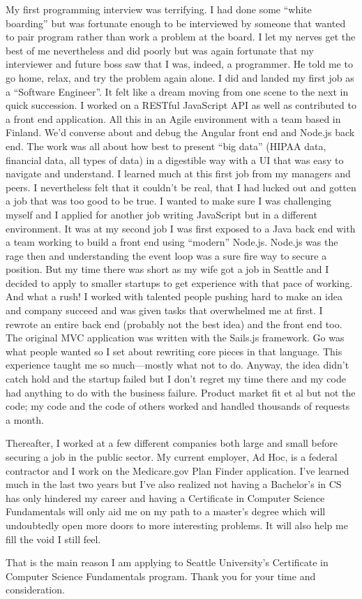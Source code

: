 \documentclass[12pt]{article}
\begin{document}
My first programming interview was terrifying. I had done some ``white boarding'' but was fortunate enough to be interviewed by someone that wanted to pair program rather than work a problem at the board. I let my nerves get the best of me nevertheless and did poorly but was again fortunate that my interviewer and future boss saw that I was, indeed, a programmer. He told me to go home, relax, and try the problem again alone. I did and landed my first job as a ``Software Engineer''. It felt like a dream moving from one scene to the next in quick succession. I worked on a RESTful JavaScript API as well as contributed to a front end application. All this in an Agile environment with a team based in Finland. We'd converse about and debug the Angular front end and Node.js back end. The work was all about how best to present ``big data'' (HIPAA data, financial data, all types of data) in a digestible way with a UI that was easy to navigate and understand. I learned much at this first job from my managers and peers. I nevertheless felt that it couldn't be real, that I had lucked out and gotten a job that was too good to be true. I wanted to make sure I was challenging myself and I applied for another job writing JavaScript but in a different environment.
It was at my second job I was first exposed to a Java back end with a team working to build a front end using ``modern'' Node.js. Node.js was the rage then and understanding the event loop was a sure fire way to secure a position. But my time there was short as my wife got a job in Seattle and I decided to apply to smaller startups to get experience with that pace of working. And what a rush! I worked with talented people pushing hard to make an idea and company succeed and was given tasks that overwhelmed me at first. I rewrote an entire back end (probably not the best idea) and the front end too. The original MVC application was written with the Sails.js framework. Go was what people wanted so I set about rewriting core pieces in that language. This experience taught me so much---mostly what not to do. Anyway, the idea didn't catch hold and the startup failed but I don't regret my time there and my code had anything to do with the business failure. Product market fit et al but not the code; my code and the code of others worked and handled thousands of requests a month.

Thereafter, I worked at a few different companies both large and small before securing a job in the public sector. My current employer, Ad Hoc, is a federal contractor and I work on the Medicare.gov Plan Finder application. I've learned much in the last two years but I've also realized not having a Bachelor's in CS has only hindered my career and having a Certificate in Computer Science Fundamentals will only aid me on my path to a master's degree which will undoubtedly open more doors to more interesting problems. It will also help me fill the void I still feel.

That is the main reason I am applying to Seattle University's Certificate in Computer Science Fundamentals program. Thank you for your time and consideration.
\end{document}
